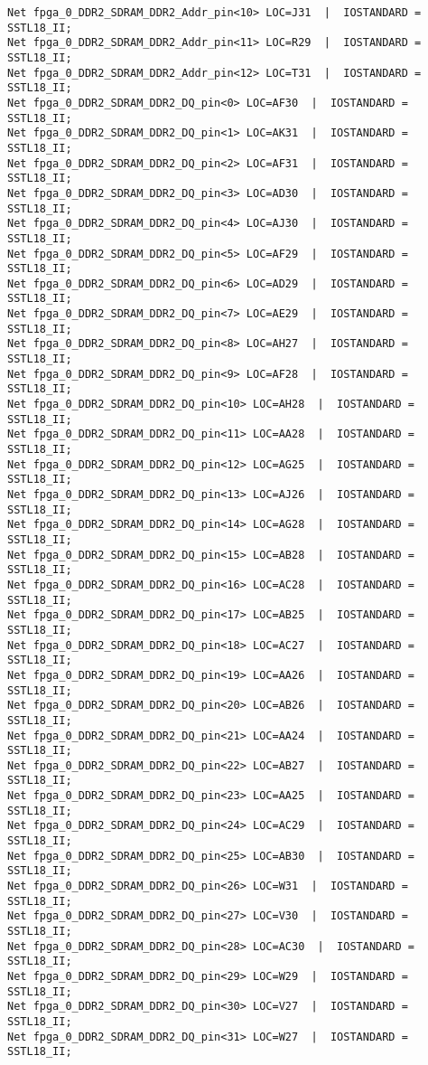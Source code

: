 \begin{verbatim}
Net fpga_0_DDR2_SDRAM_DDR2_Addr_pin<10> LOC=J31  |  IOSTANDARD = SSTL18_II;
Net fpga_0_DDR2_SDRAM_DDR2_Addr_pin<11> LOC=R29  |  IOSTANDARD = SSTL18_II;
Net fpga_0_DDR2_SDRAM_DDR2_Addr_pin<12> LOC=T31  |  IOSTANDARD = SSTL18_II;
Net fpga_0_DDR2_SDRAM_DDR2_DQ_pin<0> LOC=AF30  |  IOSTANDARD = SSTL18_II;
Net fpga_0_DDR2_SDRAM_DDR2_DQ_pin<1> LOC=AK31  |  IOSTANDARD = SSTL18_II;
Net fpga_0_DDR2_SDRAM_DDR2_DQ_pin<2> LOC=AF31  |  IOSTANDARD = SSTL18_II;
Net fpga_0_DDR2_SDRAM_DDR2_DQ_pin<3> LOC=AD30  |  IOSTANDARD = SSTL18_II;
Net fpga_0_DDR2_SDRAM_DDR2_DQ_pin<4> LOC=AJ30  |  IOSTANDARD = SSTL18_II;
Net fpga_0_DDR2_SDRAM_DDR2_DQ_pin<5> LOC=AF29  |  IOSTANDARD = SSTL18_II;
Net fpga_0_DDR2_SDRAM_DDR2_DQ_pin<6> LOC=AD29  |  IOSTANDARD = SSTL18_II;
Net fpga_0_DDR2_SDRAM_DDR2_DQ_pin<7> LOC=AE29  |  IOSTANDARD = SSTL18_II;
Net fpga_0_DDR2_SDRAM_DDR2_DQ_pin<8> LOC=AH27  |  IOSTANDARD = SSTL18_II;
Net fpga_0_DDR2_SDRAM_DDR2_DQ_pin<9> LOC=AF28  |  IOSTANDARD = SSTL18_II;
Net fpga_0_DDR2_SDRAM_DDR2_DQ_pin<10> LOC=AH28  |  IOSTANDARD = SSTL18_II;
Net fpga_0_DDR2_SDRAM_DDR2_DQ_pin<11> LOC=AA28  |  IOSTANDARD = SSTL18_II;
Net fpga_0_DDR2_SDRAM_DDR2_DQ_pin<12> LOC=AG25  |  IOSTANDARD = SSTL18_II;
Net fpga_0_DDR2_SDRAM_DDR2_DQ_pin<13> LOC=AJ26  |  IOSTANDARD = SSTL18_II;
Net fpga_0_DDR2_SDRAM_DDR2_DQ_pin<14> LOC=AG28  |  IOSTANDARD = SSTL18_II;
Net fpga_0_DDR2_SDRAM_DDR2_DQ_pin<15> LOC=AB28  |  IOSTANDARD = SSTL18_II;
Net fpga_0_DDR2_SDRAM_DDR2_DQ_pin<16> LOC=AC28  |  IOSTANDARD = SSTL18_II;
Net fpga_0_DDR2_SDRAM_DDR2_DQ_pin<17> LOC=AB25  |  IOSTANDARD = SSTL18_II;
Net fpga_0_DDR2_SDRAM_DDR2_DQ_pin<18> LOC=AC27  |  IOSTANDARD = SSTL18_II;
Net fpga_0_DDR2_SDRAM_DDR2_DQ_pin<19> LOC=AA26  |  IOSTANDARD = SSTL18_II;
Net fpga_0_DDR2_SDRAM_DDR2_DQ_pin<20> LOC=AB26  |  IOSTANDARD = SSTL18_II;
Net fpga_0_DDR2_SDRAM_DDR2_DQ_pin<21> LOC=AA24  |  IOSTANDARD = SSTL18_II;
Net fpga_0_DDR2_SDRAM_DDR2_DQ_pin<22> LOC=AB27  |  IOSTANDARD = SSTL18_II;
Net fpga_0_DDR2_SDRAM_DDR2_DQ_pin<23> LOC=AA25  |  IOSTANDARD = SSTL18_II;
Net fpga_0_DDR2_SDRAM_DDR2_DQ_pin<24> LOC=AC29  |  IOSTANDARD = SSTL18_II;
Net fpga_0_DDR2_SDRAM_DDR2_DQ_pin<25> LOC=AB30  |  IOSTANDARD = SSTL18_II;
Net fpga_0_DDR2_SDRAM_DDR2_DQ_pin<26> LOC=W31  |  IOSTANDARD = SSTL18_II;
Net fpga_0_DDR2_SDRAM_DDR2_DQ_pin<27> LOC=V30  |  IOSTANDARD = SSTL18_II;
Net fpga_0_DDR2_SDRAM_DDR2_DQ_pin<28> LOC=AC30  |  IOSTANDARD = SSTL18_II;
Net fpga_0_DDR2_SDRAM_DDR2_DQ_pin<29> LOC=W29  |  IOSTANDARD = SSTL18_II;
Net fpga_0_DDR2_SDRAM_DDR2_DQ_pin<30> LOC=V27  |  IOSTANDARD = SSTL18_II;
Net fpga_0_DDR2_SDRAM_DDR2_DQ_pin<31> LOC=W27  |  IOSTANDARD = SSTL18_II;

\end{verbatim}
